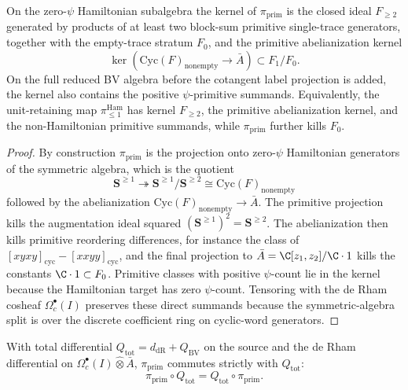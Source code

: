 \begin{lem}\label{lem:primitive-shadow-kernel}
  On the zero-\(\psi\) Hamiltonian subalgebra the kernel of
  $\pi_{\mathrm{prim}}$ is the closed ideal $F_{\geq 2}$ generated by
  products of at least two block-sum primitive single-trace generators,
  together with the
  empty-trace stratum \(F_0\), and the primitive abelianization kernel
  \[
    \ker\!\left(\mathrm{Cyc}(F)_{\mathrm{nonempty}}\to\bar A\right)
    \subset F_1/F_0 .
  \]
  On the full reduced BV algebra before the cotangent label projection is
  added, the kernel also contains the positive \(\psi\)-primitive
  summands.  Equivalently, the unit-retaining map
  \(\pi_{\leq1}^{\mathrm{Ham}}\) has kernel \(F_{\ge2}\), the primitive
  abelianization kernel, and the non-Hamiltonian primitive summands, while
  \(\pi_{\mathrm{prim}}\) further kills \(F_0\).
\end{lem}

\begin{proof}
	  By construction $\pi_{\mathrm{prim}}$ is the projection onto
	  zero-\(\psi\) Hamiltonian generators of the symmetric algebra, which is
	  the quotient
	  \[
	    \mathbf S^{\ge1}
	    \twoheadrightarrow
	    \mathbf S^{\ge1}/\mathbf S^{\ge2}
	    \cong \mathrm{Cyc}(F)_{\mathrm{nonempty}}
	  \]
	  followed by the abelianization
	  \(\mathrm{Cyc}(F)_{\mathrm{nonempty}}\to\bar A\).  The primitive
  projection kills the augmentation ideal squared
  \((\mathbf S^{\geq1})^2=\mathbf S^{\geq2}\).  The abelianization then
  kills primitive reordering differences, for instance the class of
  \([xyxy]_{\mathrm{cyc}}-[xxyy]_{\mathrm{cyc}}\), and the final
  projection to \(\bar A=\C[z_1,z_2]/\C\cdot1\) kills the constants
  \(\C\cdot1\subset F_0\).  Primitive classes with positive
  \(\psi\)-count lie in the kernel because the Hamiltonian target has
  zero \(\psi\)-count.  Tensoring with the de Rham
  cosheaf \(\Omega^\bullet_c(I)\) preserves these direct summands because
  the symmetric-algebra split is over the discrete coefficient ring on
  cyclic-word generators.
\end{proof}

\begin{thm}\label{thm:chain-level-primitive-projection-Q}
  With total differential
  \(Q_{\mathrm{tot}}=d_{\mathrm{dR}}+Q_{\mathrm{BV}}\) on the source and
  the de Rham differential on
  \(\Omega^\bullet_c(I)\widehat\otimes\bar A\),
  $\pi_{\mathrm{prim}}$ commutes strictly with $Q_{\mathrm{tot}}$:
  $$\pi_{\mathrm{prim}}\circ Q_{\mathrm{tot}}
    =Q_{\mathrm{tot}}\circ\pi_{\mathrm{prim}}.$$
\end{thm}

